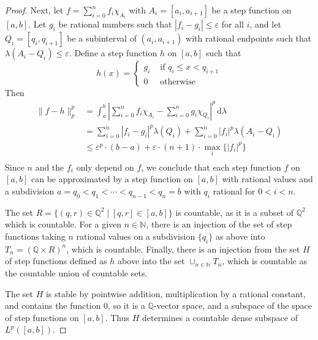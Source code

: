 \documentclass[11pt,a4paper,twoside]{article}
\theoremstyle{definition}
\theoremstyle{plain}
\begin{document}
\begin{proof}
  Next, let $f = \sum_{i = 0}^n f_i \chi_{A_i}$ with $A_i = [ a_i, a_{i + 1} ]$ be a step function on $[ a, b ]$.
  Let $g_i$ be rational numbers such that $| f_i - g_i | \leq \varepsilon$ for all $i$,
  and let $Q_i = [ q_i, q_{i + 1} ]$ be a subinterval of $( a_i, a_{i + 1} )$ with rational endpoints such that $\lambda ( A_i - Q_i ) \leq \varepsilon$.
  Define a step function $h$ on $[ a, b ]$ such that
  \begin{equation*}
    h ( x ) = \begin{cases}
      g_i &\text{ if } q_i \leq x < q_{i + 1} \\
      0 &\text{ otherwise }
    \end{cases}
  \end{equation*}
  Then
  \begin{align*}
    \| f - h \|_p^p &= \int_a^b \left| \sum_{i = 0}^n f_i \chi_{A_i} - \sum_{i = 0}^n g_i \chi_{Q_i} \right|^p \,\mathrm{d}\lambda \\
    &= \sum_{i = 0}^n | f_i - g_i |^p \lambda ( Q_i ) + \sum_{i = 0}^n | f_i |^p \lambda ( A_i - Q_i ) \\
    &\leq \varepsilon^p \cdot ( b - a ) + \varepsilon \cdot ( n + 1 ) \cdot \max_i \{ | f_i |^p \} \\
  \end{align*}
  Since $n$ and the $f_i$ only depend on $f$, we conclude that each step function $f$ on $[ a, b ]$ can be approximated by a step function on $[ a, b ]$
  with rational values and a subdivision $a = q_0 < q_1 < \dotsb < q_{n - 1} < q_n = b$ with $q_i$ rational for $0 < i < n$.

  The set $R = \{ (q, r) \in \mathbb{Q}^2 \mid [ q, r ] \in [ a, b ] \}$ is countable, as it is a subset of $\mathbb{Q}^2$ which is countable.
  For a given $n \in \mathbb{N}$, there is an injection of the set of step functions taking $n$ rational values on a subdivision $\{ q_i \}$ as above
  into $T_n = ( \mathbb{Q} \times R )^n$, which is countable. Finally, there is an injection from the set $H$ of step functions defined as $h$ above into
  the set $\cup_{n \in \mathbb{N}} T_n$, which is countable as the countable union of countable sets.

  The set $H$ is stable by pointwise addition, multiplication by a rational constant, and contains the function $0$, so it is a $\mathbb{Q}$-vector space,
  and a subspace of the space of step functions on $[ a, b ]$. Thus $H$ determines a countable dense subspace of $L^p ( [ a, b ] )$.

\end{proof}
\end{document}
